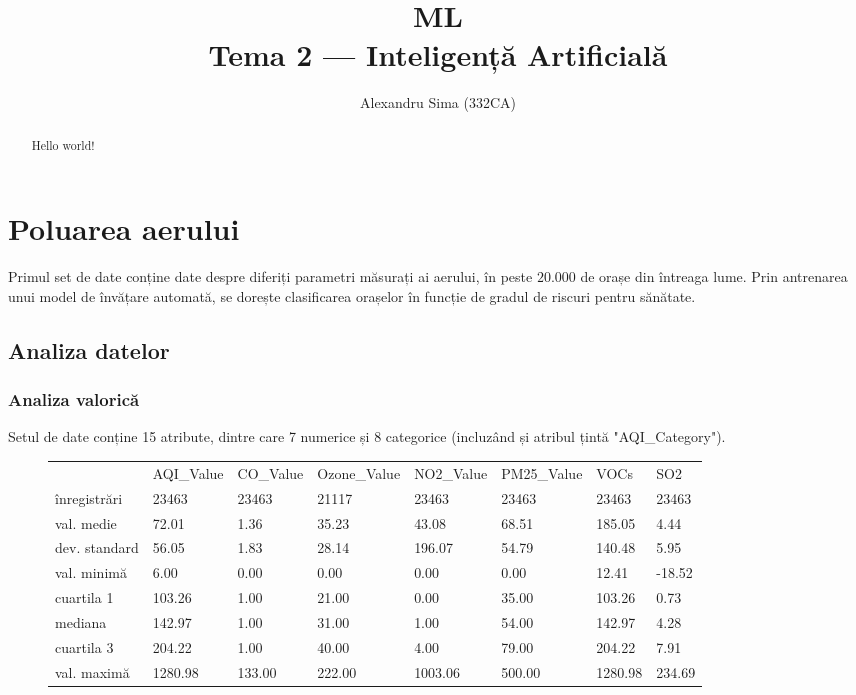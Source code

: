 \documentclass{article}
\title{{\huge ML}\\ Tema 2 --- Inteligență Artificială}
\author{Alexandru Sima (332CA)}
\begin{document}
\maketitle
\begin{abstract}
    Hello world!
\end{abstract}

\newpage
\tableofcontents

\newpage
\section{Poluarea aerului}
Primul set de date conține date despre diferiți parametri măsurați ai aerului,
în peste $20.000$ de orașe din întreaga lume. Prin antrenarea unui model de
învățare automată, se dorește clasificarea orașelor în funcție de gradul de 
riscuri pentru sănătate.

\subsection{Analiza datelor}
\subsubsection{Analiza valorică}
Setul de date conține 15 atribute, dintre care 7 numerice și 8 categorice 
(incluzând și atribul țintă "AQI\_Category").

\begin{figure}[ht]
    \centering
    \begin{tabular}{llllllll}
        & AQI\_Value & CO\_Value & Ozone\_Value & NO2\_Value & PM25\_Value & VOCs & SO2 \\
        înregistrări & 23463 & 23463 & 21117 & 23463 & 23463 & 23463 & 23463 \\
        val. medie & 72.01 & 1.36 & 35.23 & 43.08 & 68.51 & 185.05 & 4.44 \\
        dev. standard & 56.05 & 1.83&28.14 &196.07 &54.79&140.48&5.95 \\
        val. minimă & 6.00&0.00&0.00&0.00&0.00&12.41&-18.52\\
        cuartila 1 & 103.26&1.00&21.00&0.00&35.00&103.26&0.73\\
        mediana & 142.97&1.00&31.00&1.00&54.00&142.97&4.28\\
        cuartila 3 & 204.22&1.00&40.00&4.00&79.00&204.22&7.91\\
        val. maximă & 1280.98&133.00&222.00&1003.06&500.00&1280.98&234.69\\ 
    \end{tabular}
\end{figure}
\end{document}
